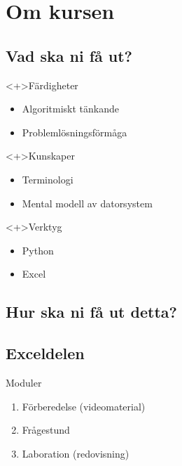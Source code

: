 \section{Om kursen}

\subsection{Vad ska ni få ut?}

\begin{frame}
  \begin{block}<+>{Färdigheter}
    \begin{itemize}
      \item Algoritmiskt tänkande
      \item Problemlösningsförmåga
    \end{itemize}
  \end{block}

  \begin{block}<+>{Kunskaper}
    \begin{itemize}
      \item Terminologi
      \item Mental modell av datorsystem
    \end{itemize}
  \end{block}

  \begin{block}<+>{Verktyg}
    \begin{itemize}
      \item Python
      \item Excel
    \end{itemize}
  \end{block}
\end{frame}

\subsection{Hur ska ni få ut detta?}

\subsection{Exceldelen}

\begin{frame}
  \begin{block}{Moduler}
    \begin{enumerate}
      \item Förberedelse (videomaterial)
      \item Frågestund
      \item Laboration (redovisning)
    \end{enumerate}
  \end{block}
\end{frame}

